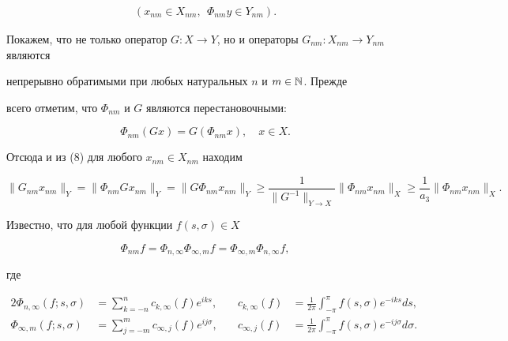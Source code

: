 \begin{pf}
\begin{gather}
(x_{n m}\in X_{n m},\ \ \Phi_{n m}y\in Y_{n m}).\tag{13$^\circ$} 


\end{gather} 


Покажем, что не только оператор $G:X\to Y$, но и операторы $G_{n 


m}:X_{n m}\to Y_{n m}$ являются 


непрерывно обратимыми при любых натуральных $n$ и $m\in\Bbb N$. Прежде 


всего отметим, что $\Phi_{n m}$ и $G$ являются перестановочными: 


\begin{equation} 


\Phi_{n m}(G x)=G(\Phi_{n m}x),\quad x\in X. 


\end{equation}  


Отсюда и из (8) для любого $x_{n m}\in X_{n m}$ находим 


\begin{equation} 


\|G_{nm}x_{nm}\|_Y=\|\Phi_{nm}G x_{nm}\|_Y= 


\|G\Phi_{nm}x_{nm}\|_Y\ge 


\frac{1}{\|G^{-1}\|_{Y\to X}}\|\Phi_{nm}x_{nm}\|_X\ge\frac{1}{a_3} 


\|\Phi_{nm}x_{nm}\|_X. 


\end{equation} 


Известно, что для любой функции $f(s,\sigma)\in X$ 


$$ 


\Phi_{nm}f=\Phi_{n,\infty}\Phi_{\infty,m}f= 


\Phi_{\infty,m}\Phi_{n,\infty}f, 


$$ 


где 


\begin{alignat*}{2} 


\Phi_{n,\infty}(f;s,\sigma)&=\sum^n_{k=-n}c_{k,\infty}(f)e^{iks},&\quad 


c_{k,\infty}(f)&=\frac{1}{2\pi}\int^\pi_{-\pi}f(s,\sigma)e^{-iks}ds, \\ 


% 


\Phi_{\infty,m}(f;s,\sigma)&=\sum^m_{j=-m}c_{\infty,j} 


(f)e^{ij\sigma},&\quad 


c_{\infty,j}(f)&=\frac{1}{2\pi}


\int^\pi_{-\pi}f(s,\sigma)e^{-ij\sigma}d\sigma. 



\end{alignat*}
\end{pf}
